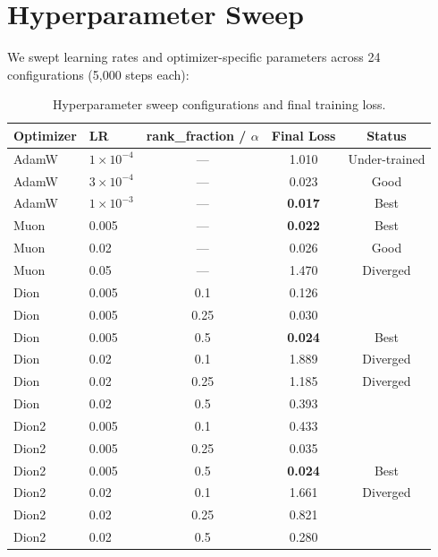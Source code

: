 \documentclass[11pt,a4paper]{article}
\begin{document}
\section{Hyperparameter Sweep}

We swept learning rates and optimizer-specific parameters across 24 configurations (5,000 steps each):

\begin{table}[H]
\centering
\caption{Hyperparameter sweep configurations and final training loss.}
\label{tab:sweep}
\begin{tabular}{llccc}
\toprule
\textbf{Optimizer} & \textbf{LR} & \textbf{rank\_fraction / $\alpha$} & \textbf{Final Loss} & \textbf{Status} \\
\midrule
AdamW   & $1\times10^{-4}$ & ---   & 1.010 & Under-trained \\
AdamW   & $3\times10^{-4}$ & ---   & 0.023 & Good \\
\rowcolor{green!10}
AdamW   & $1\times10^{-3}$ & ---   & \textbf{0.017} & Best \\
\midrule
\rowcolor{green!10}
Muon    & 0.005  & --- & \textbf{0.022} & Best \\
Muon    & 0.02   & --- & 0.026 & Good \\
Muon    & 0.05   & --- & 1.470 & Diverged \\
\midrule
Dion    & 0.005  & 0.1  & 0.126 & \\
Dion    & 0.005  & 0.25 & 0.030 & \\
\rowcolor{green!10}
Dion    & 0.005  & 0.5  & \textbf{0.024} & Best \\
Dion    & 0.02   & 0.1  & 1.889 & Diverged \\
Dion    & 0.02   & 0.25 & 1.185 & Diverged \\
Dion    & 0.02   & 0.5  & 0.393 & \\
\midrule
Dion2   & 0.005  & 0.1  & 0.433 & \\
Dion2   & 0.005  & 0.25 & 0.035 & \\
\rowcolor{green!10}
Dion2   & 0.005  & 0.5  & \textbf{0.024} & Best \\
Dion2   & 0.02   & 0.1  & 1.661 & Diverged \\
Dion2   & 0.02   & 0.25 & 0.821 & \\
Dion2   & 0.02   & 0.5  & 0.280 & \\
\bottomrule
\end{tabular}
\end{table}
\end{document}
